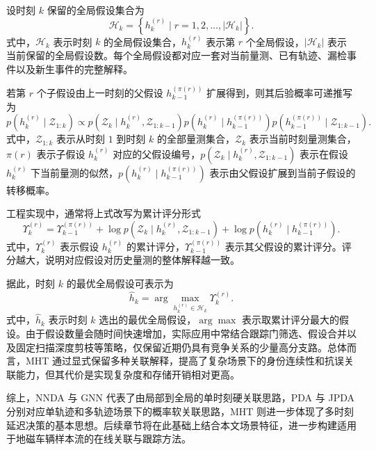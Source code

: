 \documentclass{xdupgthesis}
\begin{document}
设时刻 $k$ 保留的全局假设集合为
\begin{equation}
	\mathcal{H}_k
	=
	\left\{
	h_k^{(r)} \mid r=1,2,\ldots,|\mathcal{H}_k|
	\right\}.
\end{equation}
式中，$\mathcal{H}_k$ 表示时刻 $k$ 的全局假设集合，$h_k^{(r)}$ 表示第 $r$ 个全局假设，$|\mathcal{H}_k|$ 表示当前保留的全局假设数。每个全局假设都对应一套对当前量测、已有轨迹、漏检事件以及新生事件的完整解释。

若第 $r$ 个子假设由上一时刻的父假设 $h_{k-1}^{(\pi(r))}$ 扩展得到，则其后验概率可递推写为
\begin{equation}
	p\!\left(
	h_k^{(r)}\mid\mathcal{Z}_{1:k}
	\right)
	\propto
	p\!\left(
	\mathcal{Z}_k\mid h_k^{(r)},\mathcal{Z}_{1:k-1}
	\right)
	p\!\left(
	h_k^{(r)}\mid h_{k-1}^{(\pi(r))}
	\right)
	p\!\left(
	h_{k-1}^{(\pi(r))}\mid\mathcal{Z}_{1:k-1}
	\right).
\end{equation}
式中，$\mathcal{Z}_{1:k}$ 表示从时刻 $1$ 到时刻 $k$ 的全部量测集合，$\mathcal{Z}_k$ 表示当前时刻量测集合，$\pi(r)$ 表示子假设 $h_k^{(r)}$ 对应的父假设编号，$p(\mathcal{Z}_k\mid h_k^{(r)},\mathcal{Z}_{1:k-1})$ 表示在假设 $h_k^{(r)}$ 下当前量测的似然，$p(h_k^{(r)}\mid h_{k-1}^{(\pi(r))})$ 表示由父假设扩展到当前子假设的转移概率。

工程实现中，通常将上式改写为累计评分形式
\begin{equation}
	\Upsilon_k^{(r)}
	=
	\Upsilon_{k-1}^{(\pi(r))}
	+
	\log p\!\left(
	\mathcal{Z}_k\mid h_k^{(r)},\mathcal{Z}_{1:k-1}
	\right)
	+
	\log p\!\left(
	h_k^{(r)}\mid h_{k-1}^{(\pi(r))}
	\right).
\end{equation}
式中，$\Upsilon_k^{(r)}$ 表示假设 $h_k^{(r)}$ 的累计评分，$\Upsilon_{k-1}^{(\pi(r))}$ 表示其父假设的累计评分。评分越大，说明对应假设对历史量测的整体解释越一致。

据此，时刻 $k$ 的最优全局假设可表示为
\begin{equation}
	\hat{h}_k
	=
	\arg\max_{h_k^{(r)}\in\mathcal{H}_k}
	\Upsilon_k^{(r)}.
\end{equation}
式中，$\hat{h}_k$ 表示时刻 $k$ 选出的最优全局假设，$\arg\max$ 表示取累计评分最大的假设。由于假设数量会随时间快速增加，实际应用中常结合跟踪门筛选、假设合并以及固定扫描深度剪枝等策略，仅保留近期仍具有竞争关系的少量高分支路。总体而言，MHT 通过显式保留多种关联解释，提高了复杂场景下的身份连续性和抗误关联能力，但其代价是实现复杂度和存储开销相对更高。

综上，NNDA 与 GNN 代表了由局部到全局的单时刻硬关联思路，PDA 与 JPDA 分别对应单轨迹和多轨迹场景下的概率软关联思路，MHT 则进一步体现了多时刻延迟决策的基本思想。后续章节将在此基础上结合本文场景特征，进一步构建适用于地磁车辆样本流的在线关联与跟踪方法。
\end{document}
